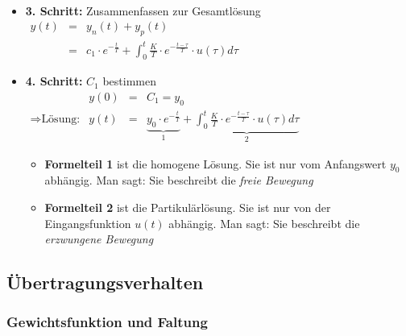 \documentclass[12pt,a4paper,ngerman]{scrartcl}
\begin{document}
\begin{itemize}
\begin{math}
\begin{array}{lllllllll}
    \end{array}
  \end{math}
\item \textbf{3. Schritt:} Zusammenfassen zur Gesamtlösung\\
  \begin{math}
    \begin{array}{lll}
      y(t)&=&y_n(t)+y_p(t)\\
          &=&c_1\cdot e^{-\frac{t}{T}}+\int_0^t{\frac{K}{T}\cdot e^{-\frac{t-\tau}{T}}\cdot u(\tau)d\tau}
    \end{array}
  \end{math}
\item \textbf{4. Schritt:} $C_1$ bestimmen\\
  \begin{math}
    \begin{array}{llll}
     &y(0)&=&C_1=y_0\\
     \Rightarrow \text{Lösung:}&y(t)&=&\underbrace{y_0\cdot e^{-\frac{t}{T}}}_{1}+\underbrace{\int_0^t{\frac{K}{T}\cdot e^{-\frac{t-\tau}{T}}\cdot u(\tau)d\tau}}_{2}
    \end{array}
  \end{math}
  \begin{itemize}
  \item \textbf{Formelteil 1} ist die homogene Lösung. Sie ist nur vom Anfangswert $y_0$ abhängig. Man sagt: Sie beschreibt die \emph{freie Bewegung}
  \item \textbf{Formelteil 2} ist die Partikulärlösung. Sie ist nur von der Eingangsfunktion $u(t)$ abhängig. Man sagt: Sie beschreibt die \emph{erzwungene Bewegung}
  \end{itemize}
\end{itemize}

\subsection{Übertragungsverhalten}

\subsubsection{Gewichtsfunktion und Faltung}
\end{document}

